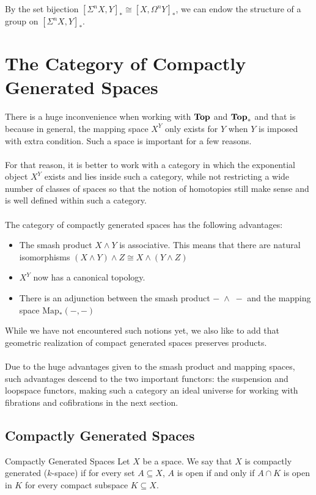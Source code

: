 \documentclass[a4paper]{article}
\begin{document}
By the set bijection $[\Sigma^nX,Y]_\ast\cong[X,\Omega^nY]_\ast$, we can endow the structure of a group on $[\Sigma^nX,Y]_\ast$. 

\pagebreak
\section{The Category of Compactly Generated Spaces}
There is a huge inconvenience when working with $\bold{Top}$ and $\bold{Top}_\ast$ and that is because in general, the mapping space $X^Y$ only exists for $Y$ when $Y$ is imposed with extra condition. Such a space is important for a few reasons. \\~\\

For that reason, it is better to work with a category in which the exponential object $X^Y$ exists and lies inside such a category, while not restricting a wide number of classes of spaces so that the notion of homotopies still make sense and is well defined within such a category. \\~\\

The category of compactly generated spaces has the following advantages: 
\begin{itemize}
\item The smash product $X\wedge Y$ is associative. This means that there are natural isomorphisms $(X\wedge Y)\wedge Z\cong X\wedge(Y\wedge Z)$
\item $X^Y$ now has a canonical topology. 
\item There is an adjunction between the smash product $-\;\wedge\;-$ and the mapping space $\text{Map}_\ast(-,-)$
\end{itemize}

While we have not encountered such notions yet, we also like to add that geometric realization of compact generated spaces preserves products. \\~\\

Due to the huge advantages given to the smash product and mapping spaces, such advantages descend to the two important functors: the suspension and loopspace functors, making such a category an ideal universe for working with fibrations and cofibrations in the next section. 

\subsection{Compactly Generated Spaces}
\begin{defn}{Compactly Generated Spaces}{} Let $X$ be a space. We say that $X$ is compactly generated ($k$-space) if for every set $A\subseteq X$, $A$ is open if and only if $A\cap K$ is open in $K$ for every compact subspace $K\subseteq X$. 
\end{defn}
\end{document}
